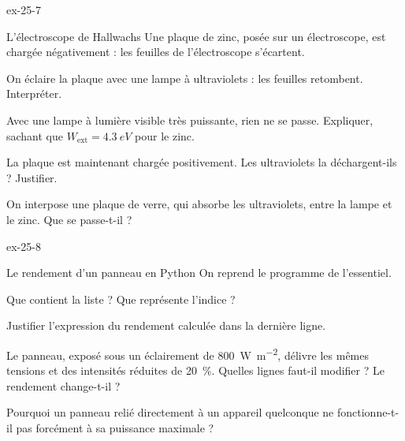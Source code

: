 \begin{blocLivre}{ex-25-7}
\begin{exercice}[2]{L'électroscope de Hallwachs}
Une plaque de zinc, posée sur un électroscope, est chargée négativement : les feuilles de l'électroscope s'écartent.
\begin{questions}
\item On éclaire la plaque avec une lampe à ultraviolets : les feuilles retombent. Interpréter.
\item Avec une lampe à lumière visible très puissante, rien ne se passe. Expliquer, sachant que $W_\mathrm{ext}=\qty{4,3}{eV}$
pour le zinc.
\item La plaque est maintenant chargée positivement. Les ultraviolets la déchargent-ils ? Justifier.
\item On interpose une plaque de verre, qui absorbe les ultraviolets, entre la lampe et le zinc. Que se passe-t-il ?
\end{questions}
\end{exercice}
\end{blocLivre}
\begin{blocLivre}{ex-25-8}
\begin{exercice}[2]{Le rendement d'un panneau en Python}
On reprend le programme de l'essentiel.
\begin{questions}
\item {}Que contient la liste  ? Que représente l'indice  ?
\item Justifier l'expression du rendement calculée dans la dernière ligne.
\item Le panneau, exposé sous un éclairement de \qty{800}{W.m^{-2}}, délivre les mêmes tensions et des intensités réduites
de 20~\%. Quelles lignes faut-il modifier ? Le rendement change-t-il ?
\item Pourquoi un panneau relié directement à un appareil quelconque ne fonctionne-t-il pas forcément à sa puissance
maximale ?
\end{questions}
\end{exercice}
\end{blocLivre}

